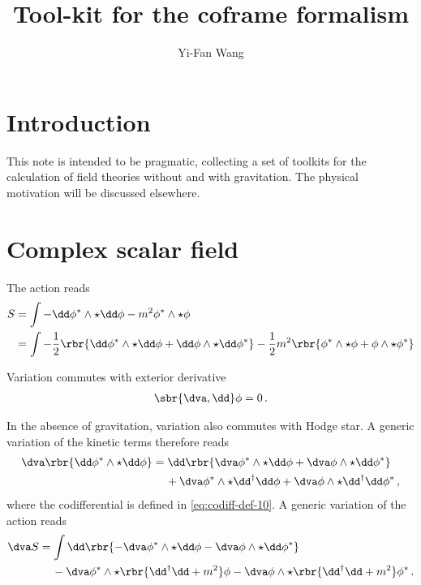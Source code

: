 \documentclass[a4paper]{article}
\title{Tool-kit for the coframe formalism}
\author{Yi-Fan Wang}
\begin{document}
\maketitle


\tableofcontents

\section{Introduction}


This note is intended to be pragmatic, collecting a set of toolkits for the 
calculation of field theories without and with gravitation. The physical 
motivation will be discussed elsewhere.

\section{Complex scalar field}


The action reads
\begin{align}
S &= \int -\dd\phi^*\wedge\star\dd\phi - m^2 \phi^*\wedge\star\phi
\\
&= \int -\frac{1}{2}\rbr{\dd\phi^*\wedge\star\dd\phi 
		+ \dd\phi\wedge\star\dd\phi^*}
		- \frac{1}{2} m^2 \rbr{\phi^*\wedge\star\phi
		+ \phi\wedge\star\phi^*}
\end{align}

Variation commutes with exterior derivative
\begin{align}
\sbr{\dva, \dd}\phi = 0\,.
\end{align}

In the absence of gravitation, variation also commutes with Hodge star. A 
generic variation of the kinetic terms therefore reads
\begin{align}
\begin{split}
\dva \rbr{\dd \phi^*\wedge\star\dd\phi} &= 
\dd\rbr{\dva\phi^*\wedge\star\dd\phi + \dva\phi\wedge\star\dd\phi^*}
\\
&\quad\,+
\dva\phi^*\wedge\star\dd^{\dagger}\dd\phi +
\dva\phi\wedge\star\dd^{\dagger}\dd\phi^*\,,
\end{split}
\end{align}
where the codifferential is defined in \cref{eq:codiff-def-10}.
A generic variation of the action reads
\begin{align}
\dva S &=
\int \dd\rbr{-\dva\phi^*\wedge\star\dd\phi -
\dva\phi\wedge\star\dd\phi^*}
\nonumber \\
&\quad\,-
\dva\phi^*\wedge\star\rbr{\dd^{\dagger}\dd+m^2}\phi -
\dva\phi\wedge\star\rbr{\dd^{\dagger}\dd+m^2}\phi^*\,.
\end{align}
\end{document}
